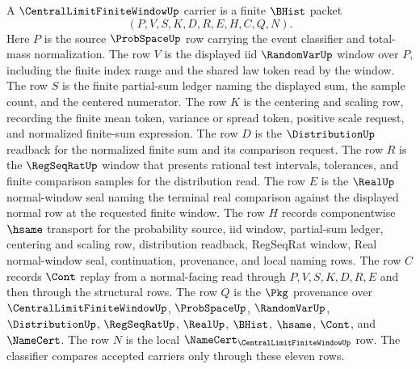\begin{definition}\label{def:central-limit-finite-window-carrier}
A $\CentralLimitFiniteWindowUp$ carrier is a finite $\BHist$ packet
$$
(P,V,S,K,D,R,E,H,C,Q,N).
$$
Here $P$ is the source $\ProbSpaceUp$ row carrying the event classifier and total-mass normalization. The row $V$ is the displayed iid $\RandomVarUp$ window over $P$, including the finite index range and the shared law token read by the window. The row $S$ is the finite partial-sum ledger naming the displayed sum, the sample count, and the centered numerator. The row $K$ is the centering and scaling row, recording the finite mean token, variance or spread token, positive scale request, and normalized finite-sum expression. The row $D$ is the $\DistributionUp$ readback for the normalized finite sum and its comparison request. The row $R$ is the $\RegSeqRatUp$ window that presents rational test intervals, tolerances, and finite comparison samples for the distribution read. The row $E$ is the $\RealUp$ normal-window seal naming the terminal real comparison against the displayed normal row at the requested finite window. The row $H$ records componentwise $\hsame$ transport for the probability source, iid window, partial-sum ledger, centering and scaling row, distribution readback, RegSeqRat window, Real normal-window seal, continuation, provenance, and local naming rows. The row $C$ records $\Cont$ replay from a normal-facing read through $P,V,S,K,D,R,E$ and then through the structural rows. The row $Q$ is the $\Pkg$ provenance over $\CentralLimitFiniteWindowUp$, $\ProbSpaceUp$, $\RandomVarUp$, $\DistributionUp$, $\RegSeqRatUp$, $\RealUp$, $\BHist$, $\hsame$, $\Cont$, and $\NameCert$. The row $N$ is the local $\NameCert_{\CentralLimitFiniteWindowUp}$ row. The classifier compares accepted carriers only through these eleven rows.
\end{definition}

